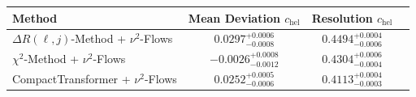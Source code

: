     \begin{tabular}{lccc}
        \toprule
        Method & Mean Deviation $c_{\text{hel}}$ & Resolution $c_{\text{hel}}$ \\
        \midrule
        $\Delta R(\ell,j)$-Method + $\nu^2$-Flows & $0.0297^{+0.0006}_{-0.0008}$ & $0.4494^{+0.0004}_{-0.0006}$ \\
        $\chi^2$-Method + $\nu^2$-Flows & $-0.0026^{+0.0008}_{-0.0012}$ & $0.4304^{+0.0006}_{-0.0004}$ \\
        CompactTransformer + $\nu^2$-Flows & $0.0252^{+0.0005}_{-0.0006}$ & $0.4113^{+0.0004}_{-0.0003}$ \\
        \bottomrule
    \end{tabular}